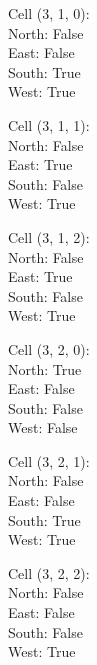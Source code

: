 \documentclass{article}
\begin{document}
\begin{multicols*}{3}
Cell (3, 1, 0):\\
\-\hspace{2cm}North: False\\
\-\hspace{2cm}East: False\\
\-\hspace{2cm}South: True\\
\-\hspace{2cm}West: True

Cell (3, 1, 1):\\
\-\hspace{2cm}North: False\\
\-\hspace{2cm}East: True\\
\-\hspace{2cm}South: False\\
\-\hspace{2cm}West: True

Cell (3, 1, 2):\\
\-\hspace{2cm}North: False\\
\-\hspace{2cm}East: True\\
\-\hspace{2cm}South: False\\
\-\hspace{2cm}West: True

Cell (3, 2, 0):\\
\-\hspace{2cm}North: True\\
\-\hspace{2cm}East: False\\
\-\hspace{2cm}South: False\\
\-\hspace{2cm}West: False

Cell (3, 2, 1):\\
\-\hspace{2cm}North: False\\
\-\hspace{2cm}East: False\\
\-\hspace{2cm}South: True\\
\-\hspace{2cm}West: True

Cell (3, 2, 2):\\
\-\hspace{2cm}North: False\\
\-\hspace{2cm}East: False\\
\-\hspace{2cm}South: False\\
\-\hspace{2cm}West: True


\end{multicols*}
\end{document}
